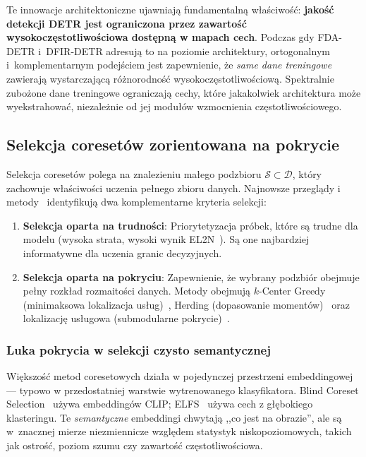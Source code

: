 Te innowacje architektoniczne ujawniają fundamentalną właściwość:
\textbf{jakość detekcji DETR jest ograniczona przez zawartość
wysokoczęstotliwościowa dostępną w mapach cech}.  Podczas gdy FDA-DETR
i~DFIR-DETR adresują to na poziomie architektury, ortogonalnym
i~komplementarnym podejściem jest zapewnienie, że \emph{same dane treningowe}
zawierają wystarczającą różnorodność wysokoczęstotliwościową.  Spektralnie
zubożone dane treningowe ograniczają cechy, które jakakolwiek architektura
może wyekstrahować, niezależnie od jej modułów wzmocnienia
częstotliwościowego.


\subsection{Selekcja coresetów zorientowana na pokrycie}
\label{sec:coreset_coverage}

Selekcja coresetów polega na znalezieniu małego podzbioru
$\mathcal{S} \subset \mathcal{D}$, który zachowuje właściwości uczenia
pełnego zbioru danych.  Najnowsze przeglądy i metody~\cite{coreset_survey2025}
identyfikują dwa komplementarne kryteria selekcji:

\begin{enumerate}
    \item \textbf{Selekcja oparta na trudności}: Priorytetyzacja próbek,
          które są trudne dla modelu (wysoka strata, wysoki wynik
          EL2N~\cite{paul2021deep}).  Są one najbardziej informatywne dla
          uczenia granic decyzyjnych.

    \item \textbf{Selekcja oparta na pokryciu}: Zapewnienie, że wybrany
          podzbiór obejmuje pełny rozkład rozmaitości danych.  Metody
          obejmują $k$-Center Greedy (minimaksowa lokalizacja
          usług)~\cite{coreset_survey2025}, Herding (dopasowanie
          momentów)~\cite{welling2009herding} oraz lokalizację usługowa
          (submodularne pokrycie)~\cite{facility_location}.
\end{enumerate}

\subsubsection{Luka pokrycia w selekcji czysto semantycznej}

Większość metod coresetowych działa w pojedynczej przestrzeni embeddingowej
--- typowo w przedostatniej warstwie wytrenowanego klasyfikatora.  Blind
Coreset Selection~\cite{blindcs2025} używa embeddingów CLIP;
ELFS~\cite{elfs2025} używa cech z głębokiego klasteringu.  Te
\emph{semantyczne} embeddingi chwytają ,,co jest na obrazie'', ale są
w~znacznej mierze niezmiennicze względem statystyk niskopoziomowych, takich
jak ostrość, poziom szumu czy zawartość częstotliwościowa.

